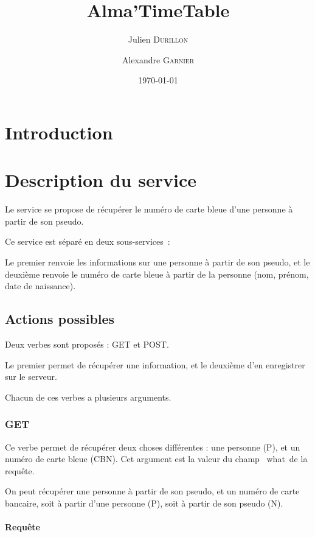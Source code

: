 \documentclass[a4paper,11pt,french]{article}
\title{Alma'TimeTable}
\author{Julien \textsc{Durillon} \and Alexandre \textsc{Garnier}}
\date{\today}
\begin{document}
\maketitle

\section*{Introduction}

\section{Description du service}

Le service se propose de récupérer le numéro de carte bleue d'une personne
à partir de son pseudo.

Ce service est séparé en deux sous-services~:

Le premier renvoie les informations sur une personne à partir de son
pseudo, et le deuxième renvoie le numéro de carte bleue à partir de la
personne (nom, prénom, date de naissance).


\subsection{Actions possibles}

Deux verbes sont proposés : GET et POST.

Le premier permet de récupérer une information, et le deuxième d'en
enregistrer sur le serveur.

Chacun de ces verbes a plusieurs arguments.

\subsubsection{GET}

            Ce verbe permet de récupérer deux choses différentes : une personne
            (P), et un numéro de carte bleue (CBN). Cet argument est la valeur
            du champ \og~what~\fg de la requête.

            On peut récupérer une personne à partir de son pseudo, et un numéro
            de carte bancaire, soit à partir d'une personne (P), soit à partir de
            son pseudo (N).
            
            \paragraph{Requête}
            
\end{document}
